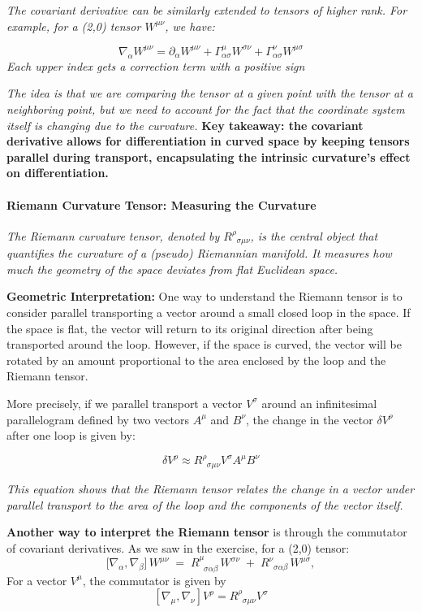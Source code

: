 \textit{The covariant derivative can be similarly extended to tensors of higher rank. For example, for a (2,0) tensor \(W^{\mu\nu}\), we have:}

\[
\nabla_\alpha W^{\mu\nu} = \partial_\alpha W^{\mu\nu} + \Gamma^\mu_{\alpha\sigma} W^{\sigma\nu} + \Gamma^\nu_{\alpha\sigma} W^{\mu\sigma}
\]
\textit{Each upper index gets a correction term with a positive sign}

\textit{The idea is that we are comparing the tensor at a given point with the tensor at a neighboring point, but we need to account for the fact that the coordinate system itself is changing due to the curvature.}
\textbf{Key takeaway: the covariant derivative allows for differentiation in curved space by keeping tensors parallel during transport, encapsulating the intrinsic curvature's effect on differentiation.}

\paragraph{Riemann Curvature Tensor: Measuring the Curvature}

\textit{The Riemann curvature tensor, denoted by \(R^\rho_{\;\;\sigma\mu\nu}\), is the central object that quantifies the curvature of a (pseudo) Riemannian manifold. It measures how much the geometry of the space deviates from flat Euclidean space.}

\textbf{Geometric Interpretation:} One way to understand the Riemann tensor is to consider parallel transporting a vector around a small closed loop in the space. If the space is flat, the vector will return to its original direction after being transported around the loop. However, if the space is curved, the vector will be rotated by an amount proportional to the area enclosed by the loop and the Riemann tensor.

More precisely, if we parallel transport a vector \(V^\sigma\) around an infinitesimal parallelogram defined by two vectors \(A^\mu\) and \(B^\nu\), the change in the vector \(\delta V^\rho\) after one loop is given by:

\[
\delta V^\rho \approx R^\rho_{\;\;\sigma\mu\nu} V^\sigma A^\mu B^\nu
\]

\textit{This equation shows that the Riemann tensor relates the change in a vector under parallel transport to the area of the loop and the components of the vector itself.}

\textbf{Another way to interpret the Riemann tensor} is through the commutator of covariant derivatives. As we saw in the exercise, for a (2,0) tensor:
\[
\bigl[\nabla_{\alpha}, \nabla_{\beta}\bigr]\,W^{\mu\nu}
\;=\;
R^\mu_{\;\;\sigma\alpha\beta}\,W^{\sigma\nu}
\;+\;
R^\nu_{\;\;\sigma\alpha\beta}\,W^{\mu\sigma},
\]
For a vector \(V^\mu\), the commutator is given by
\[
[\nabla_\mu, \nabla_\nu] V^\rho = R^\rho_{\;\;\sigma\mu\nu} V^\sigma
\]

